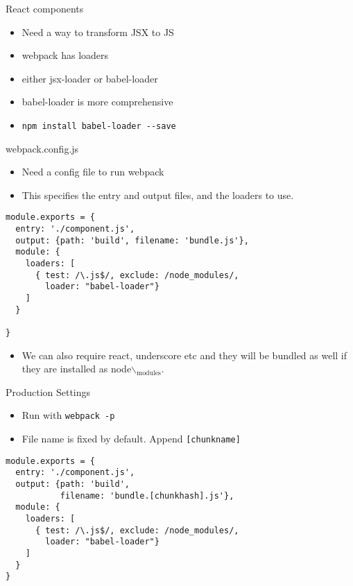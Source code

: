 \documentclass[presentation]{beamer}
\begin{document}
\begin{frame}[fragile,label=sec-6]{React components}
 \begin{itemize}
\item Need a way to transform JSX to JS
\item webpack has loaders
\item either jsx-loader or babel-loader
\item babel-loader is more comprehensive
\item \texttt{npm install babel-loader -{}-save}
\end{itemize}
\end{frame}

\begin{frame}[fragile,label=sec-7]{webpack.config.js}
 \begin{itemize}
\item Need a config file to run webpack
\item This specifies the entry and output files, and the loaders to use.
\end{itemize}

\begin{verbatim}
module.exports = {
  entry: './component.js',
  output: {path: 'build', filename: 'bundle.js'},
  module: {
    loaders: [
      { test: /\.js$/, exclude: /node_modules/,
        loader: "babel-loader"}
    ]
  }

}
\end{verbatim}

\begin{itemize}
\item We can also require react, underscore etc and they will be bundled as well
if they are installed as node$\backslash$$_{\text{modules}}$.
\end{itemize}
\end{frame}

\begin{frame}[fragile,label=sec-8]{Production Settings}
 \begin{itemize}
\item Run with \texttt{webpack -p}
\item File name is fixed by default. Append \texttt{[chunkname]}
\end{itemize}
\begin{verbatim}
module.exports = {
  entry: './component.js',
  output: {path: 'build',
           filename: 'bundle.[chunkhash].js'},
  module: {
    loaders: [
      { test: /\.js$/, exclude: /node_modules/,
        loader: "babel-loader"}
    ]
  }
}
\end{verbatim}
\end{frame}
\end{document}

